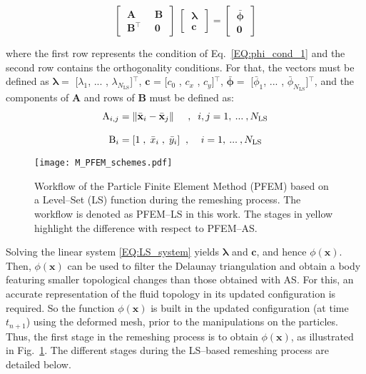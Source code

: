 \documentclass[final,3p,times]{elsarticle}
\newcommand{\EF}[1]{{\color{black}{#1}}}
\begin{document}
\begin{equation}\label{EQ:LS_system}
\left[
\:
\begin{matrix}
\mathbf{A} \;&\; \mathbf{B}
\\[2ex]
\mathbf{B}^\intercal \;&\; \bm{0}
\end{matrix}
\:
\right]
\;
\left[
\:
\begin{matrix}
\bm{\lambda}
\\[2ex]
\bm{c}
\end{matrix}
\:
\right]
=
\left[
\:
\begin{matrix}
\bar{\bm{\phi}}
\\[2ex]
\bm{0}
\end{matrix}
\:
\right]
\end{equation}

\noindent where the first row represents the condition of Eq.~\eqref{EQ:phi_cond_1} and the second row contains the orthogonality conditions. For that, the vectors must be defined as $\bm{\lambda}=$ [$\lambda_1$, ... , $\lambda_{N_\mathrm{LS}}$]$^\intercal$, $\bm{c}$ = [$c_0$ , $c_x$ , $c_y$]$^\intercal$, $\bar{\bm{\phi}}=$ [$\bar{{\phi}}_1$, ... , $\bar{{\phi}}_{N_\mathrm{LS}}$]$^\intercal$, and the components of $\mathbf{A}$ and rows of $\mathbf{B}$ must be defined as: 
%
\begin{subequations}
\begin{align}
\mathrm{A}_{i,j} &=  \| \bar{\mathbf{x}}_i - \bar{\mathbf{x}}_j\| \;\;\;\;\; , \;\; i,j=1, \: ... \: , N_\EF{\mathrm{LS}}
\\[2ex]
\mathrm{B}_{i} &= [1 \;,\; \bar{x}_i \;,\; \bar{y}_i] \;\; , \;\;\;\; i = 1,\: ... \: , N_\EF{\mathrm{LS}}
\end{align}
\end{subequations}
\vspace{1mm}


\begin{figure}[t] \captionsetup[sub]{font=normalsize}
	\centering 
	\texttt{[image: M\_PFEM\_schemes.pdf]}
	\caption{Workflow of the Particle Finite Element Method (PFEM) based on a Level--Set (LS) function during the remeshing process. The workflow is denoted as PFEM--LS in this work. The stages in yellow highlight the difference with respect to PFEM--AS.}
	\label{Fig:PFEM_schemes_pdf_LS}
\end{figure}

Solving the linear system \eqref{EQ:LS_system} yields $\bm{\lambda}$ and $\bm{c}$, and hence $\phi(\mathbf{x})$. Then, $\phi(\mathbf{x})$ can be used to filter the Delaunay triangulation and obtain a body featuring smaller topological changes than those obtained with AS. For this, an accurate representation of the fluid topology in its updated configuration is required. So the function $\phi(\mathbf{x})$ is built in the updated configuration (at time $t_{n+1}$) using the deformed mesh, prior to the manipulations on the particles. Thus, the first stage in the remeshing process is to obtain $\phi(\mathbf{x})$, as illustrated in Fig.~\ref{Fig:PFEM_schemes_pdf_LS}. The different stages during the LS--based remeshing process are detailed below.
\end{document}
